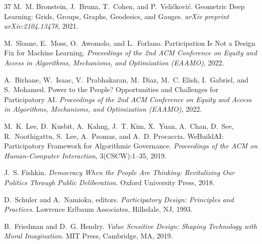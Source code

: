 \documentclass[12pt]{article}
\begin{document}
\begin{thebibliography}{37}
M.~M. Bronstein, J.~Bruna, T.~Cohen, and P.~Veli\v{c}kovi\'{c}.
\newblock Geometric Deep Learning: Grids, Groups, Graphs, Geodesics, and Gauges.
\newblock \emph{arXiv preprint arXiv:2104.13478}, 2021.

M.~Sloane, E.~Moss, O.~Awomolo, and L.~Forlano.
\newblock Participation Is Not a Design Fix for Machine Learning.
\newblock \emph{Proceedings of the 2nd ACM Conference on Equity and Access in Algorithms, Mechanisms, and Optimization (EAAMO)}, 2022.

A.~Birhane, W.~Isaac, V.~Prabhakaran, M.~Diaz, M.~C. Elish, I.~Gabriel, and S.~Mohamed.
\newblock Power to the People? Opportunities and Challenges for Participatory AI.
\newblock \emph{Proceedings of the 2nd ACM Conference on Equity and Access in Algorithms, Mechanisms, and Optimization (EAAMO)}, 2022.

M.~K. Lee, D.~Kusbit, A.~Kahng, J.~T. Kim, X.~Yuan, A.~Chan, D.~See, R.~Noothigattu, S.~Lee, A.~Psomas, and A.~D. Procaccia.
\newblock WeBuildAI: Participatory Framework for Algorithmic Governance.
\newblock \emph{Proceedings of the ACM on Human-Computer Interaction}, 3(CSCW):1--35, 2019.

J.~S. Fishkin.
\newblock \emph{Democracy When the People Are Thinking: Revitalizing Our Politics Through Public Deliberation}.
\newblock Oxford University Press, 2018.

D.~Schuler and A.~Namioka, editors.
\newblock \emph{Participatory Design: Principles and Practices}.
\newblock Lawrence Erlbaum Associates, Hillsdale, NJ, 1993.

B.~Friedman and D.~G. Hendry.
\newblock \emph{Value Sensitive Design: Shaping Technology with Moral Imagination}.
\newblock MIT Press, Cambridge, MA, 2019.

\end{thebibliography}
\end{document}
